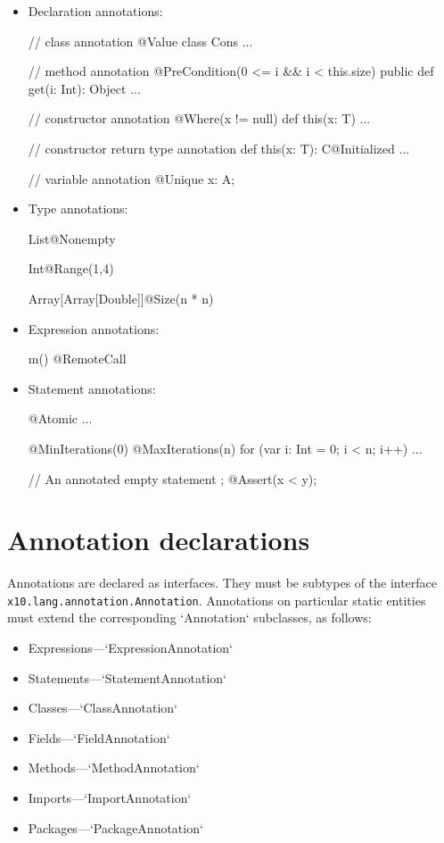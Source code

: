 \begin{itemize}
\item Declaration annotations:
\begin{xtennoindent}
  // class annotation
  @Value
  class Cons { ... }

  // method annotation
  @PreCondition(0 <= i && i < this.size)
  public def get(i: Int): Object { ... }

  // constructor annotation
  @Where(x != null)
  def this(x: T) { ... }

  // constructor return type annotation
  def this(x: T): C@Initialized { ... }

  // variable annotation
  @Unique x: A;
\end{xtennoindent}
\item Type annotations:
\begin{xtennoindent}
  List@Nonempty

  Int@Range(1,4)

  Array[Array[Double]]@Size(n * n)
\end{xtennoindent}
\item Expression annotations:
\begin{xtennoindent}
  m()  @RemoteCall
\end{xtennoindent}
\item Statement annotations:
\begin{xtennoindent}
  @Atomic { ... }

  @MinIterations(0)
  @MaxIterations(n)
  for (var i: Int = 0; i < n; i++) { ... }

  // An annotated empty statement ;
  @Assert(x < y);
\end{xtennoindent}
\end{itemize}

\section{Annotation declarations}

Annotations are declared as interfaces.  They must be
subtypes of the interface \texttt{x10.lang.annotation.Annotation}.
Annotations on particular static entities must extend the corresponding
\xcd`Annotation` subclasses, as follows: 
\begin{itemize}
\item Expressions---\xcd`ExpressionAnnotation`
\item Statements---\xcd`StatementAnnotation`
\item Classes---\xcd`ClassAnnotation`
\item Fields---\xcd`FieldAnnotation`
\item Methods---\xcd`MethodAnnotation`
\item Imports---\xcd`ImportAnnotation`
\item Packages---\xcd`PackageAnnotation`
\end{itemize}
